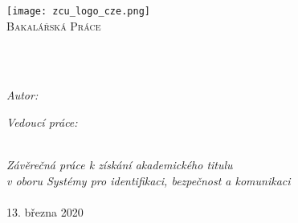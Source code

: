 \frontmatter %

\pagestyle{plain} %


\begin{titlepage}
\begin{center}
\texttt{[image: zcu\_logo\_cze.png]} %
\\\vspace{3cm}
\textsc{\Large Bakalářská Práce}\\[0.2cm] 	 %

\HRule \\[0.4cm] %
{\huge \bfseries \ttitle\par}\vspace{0.4cm} %
\HRule \\[1.5cm] %
 
\begin{minipage}[t]{0.45\textwidth}
\begin{flushleft} \large
\emph{Autor:}\\{\authorname}
\end{flushleft}
\end{minipage}
\begin{minipage}[t]{0.45\textwidth}
\begin{flushright} \large
\emph{Vedoucí práce:} \\
\href{http://www.kky.zcu.cz/cs/people/bulin-martin}{\supname}
\end{flushright}
\end{minipage}\\[2.5cm]
 
\large \textit{Závěrečná práce k získání akademického titulu  \degreename} \\[0.3cm] %
\textit{v oboru Systémy pro identifikaci, bezpečnost a komunikaci}\\[0.4cm]

\deptname %
 \\\vspace{2cm}
{\large 13. března 2020} 
 
\vfill
\end{center}
\end{titlepage}